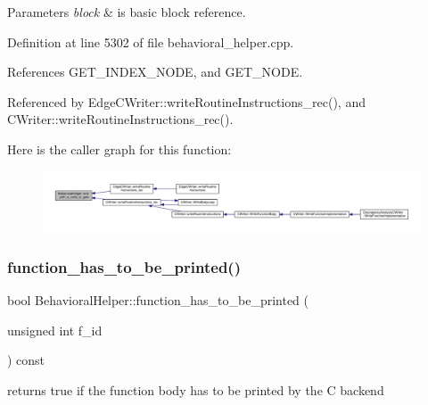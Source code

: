 \begin{DoxyParams}{Parameters}
{\em block} & is basic block reference. \\
\hline
\end{DoxyParams}


Definition at line 5302 of file behavioral\+\_\+helper.\+cpp.



References G\+E\+T\+\_\+\+I\+N\+D\+E\+X\+\_\+\+N\+O\+DE, and G\+E\+T\+\_\+\+N\+O\+DE.



Referenced by Edge\+C\+Writer\+::write\+Routine\+Instructions\+\_\+rec(), and C\+Writer\+::write\+Routine\+Instructions\+\_\+rec().

Here is the caller graph for this function\+:
\nopagebreak
\begin{figure}[H]
\begin{center}
\leavevmode
\includegraphics[width=350pt]{dd/db2/classBehavioralHelper_a9f4fe1300d7b260198d907674c784fb2_icgraph}
\end{center}
\end{figure}
\mbox{\label{classBehavioralHelper_a06c2b533436efe15b08253dea9eb5222}} 
\subsubsection{\texorpdfstring{function\+\_\+has\+\_\+to\+\_\+be\+\_\+printed()}{function\_has\_to\_be\_printed()}}
{\footnotesize\ttfamily bool Behavioral\+Helper\+::function\+\_\+has\+\_\+to\+\_\+be\+\_\+printed (\begin{DoxyParamCaption}\item[{unsigned int}]{f\+\_\+id }\end{DoxyParamCaption}) const}



returns true if the function body has to be printed by the C backend 



